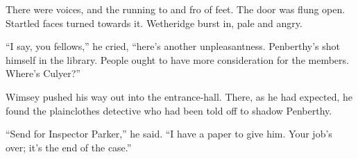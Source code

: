 There were voices, and the running to and fro of feet. The door was flung open. Startled faces turned towards it. Wetheridge burst in, pale and angry.

\enquote{I say, you fellows,} he cried, \enquote{here's another unpleasantness. Penberthy's shot himself in the library. People ought to have more consideration for the members. Where's Culyer?}

Wimsey pushed his way out into the entrance-hall. There, as he had expected, he found the plainclothes detective who had been told off to shadow Penberthy.

\enquote{Send for Inspector Parker,} he said. \enquote{I have a paper to give him. Your job's over; it's the end of the case.}